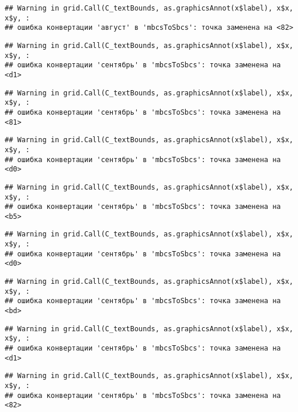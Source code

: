 \documentclass[
]{article}
\begin{document}
\begin{verbatim}
## Warning in grid.Call(C_textBounds, as.graphicsAnnot(x$label), x$x, x$y, :
## ошибка конвертации 'август' в 'mbcsToSbcs': точка заменена на <82>
\end{verbatim}

\begin{verbatim}
## Warning in grid.Call(C_textBounds, as.graphicsAnnot(x$label), x$x, x$y, :
## ошибка конвертации 'сентябрь' в 'mbcsToSbcs': точка заменена на <d1>
\end{verbatim}

\begin{verbatim}
## Warning in grid.Call(C_textBounds, as.graphicsAnnot(x$label), x$x, x$y, :
## ошибка конвертации 'сентябрь' в 'mbcsToSbcs': точка заменена на <81>
\end{verbatim}

\begin{verbatim}
## Warning in grid.Call(C_textBounds, as.graphicsAnnot(x$label), x$x, x$y, :
## ошибка конвертации 'сентябрь' в 'mbcsToSbcs': точка заменена на <d0>
\end{verbatim}

\begin{verbatim}
## Warning in grid.Call(C_textBounds, as.graphicsAnnot(x$label), x$x, x$y, :
## ошибка конвертации 'сентябрь' в 'mbcsToSbcs': точка заменена на <b5>
\end{verbatim}

\begin{verbatim}
## Warning in grid.Call(C_textBounds, as.graphicsAnnot(x$label), x$x, x$y, :
## ошибка конвертации 'сентябрь' в 'mbcsToSbcs': точка заменена на <d0>
\end{verbatim}

\begin{verbatim}
## Warning in grid.Call(C_textBounds, as.graphicsAnnot(x$label), x$x, x$y, :
## ошибка конвертации 'сентябрь' в 'mbcsToSbcs': точка заменена на <bd>
\end{verbatim}

\begin{verbatim}
## Warning in grid.Call(C_textBounds, as.graphicsAnnot(x$label), x$x, x$y, :
## ошибка конвертации 'сентябрь' в 'mbcsToSbcs': точка заменена на <d1>
\end{verbatim}

\begin{verbatim}
## Warning in grid.Call(C_textBounds, as.graphicsAnnot(x$label), x$x, x$y, :
## ошибка конвертации 'сентябрь' в 'mbcsToSbcs': точка заменена на <82>
\end{verbatim}
\end{document}
